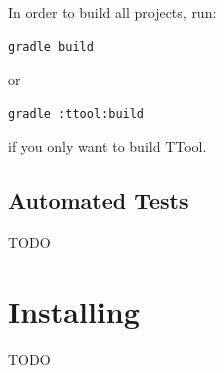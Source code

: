 \documentclass[12pt]{article}
\begin{document}
In order to build all projects, run:
\begin{verbatim}
gradle build
\end{verbatim}
or 
\begin{verbatim}
gradle :ttool:build
\end{verbatim}
if you only want to build TTool.

\subsection{Automated Tests}
TODO

\section{Installing}
TODO
\end{document}
